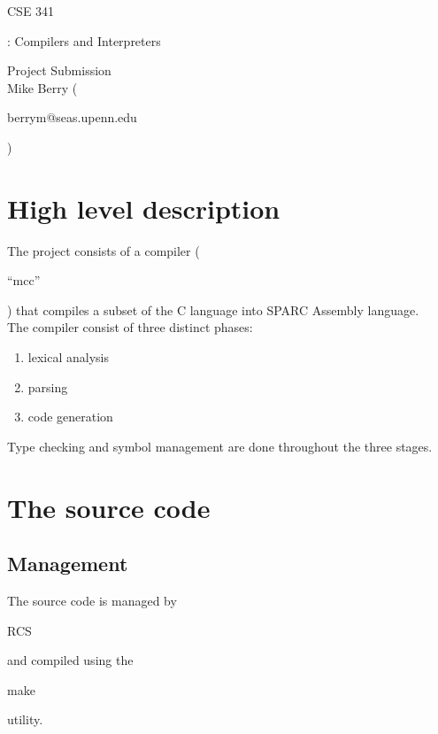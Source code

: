 
\setlength{\parindent}{0em}

\begin{center}
{\LARGE \begin{bf}CSE 341\end{bf}: Compilers and Interpreters \\  }
Project Submission \\
Mike Berry (\begin{it}berrym@seas.upenn.edu\end{it}) \\

\end{center}

\section{High level description}

The project consists of a compiler (\begin{it}``mcc''\end{it}) that
compiles a subset of the C language into SPARC Assembly language. \\

The compiler consist of three distinct phases:
\begin{enumerate}

\item lexical analysis

\item parsing

\item code generation
\end{enumerate}

Type checking and symbol management are done throughout the three
stages.

\section{The source code}

\subsection{Management}

The source code is managed by \begin{it}RCS\end{it} and compiled using the
\begin{it}make\end{it} utility.

